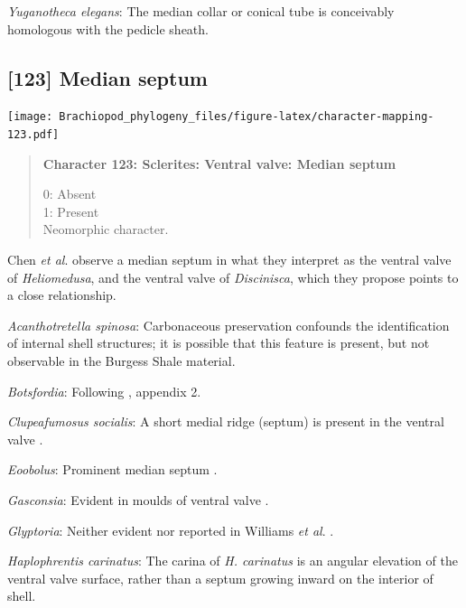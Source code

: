\documentclass[openany]{book}
\begin{document}
\hypertarget{Yuganotheca_elegans-coding-122}{}
\emph{Yuganotheca elegans}: The median collar or conical tube is
conceivably homologous with the pedicle sheath.

\subsection*{{[}123{]} Median septum}\label{median-septum}

\texttt{[image: Brachiopod\_phylogeny\_files/figure-latex/character-mapping-123.pdf]}

\begin{quote}
\textbf{Character 123: Sclerites: Ventral valve: Median septum}

0: Absent\\
1: Present\\
Neomorphic character.
\end{quote}

Chen \emph{et al}. \citeyearpar{Chen2007Reinterpretationof} observe a
median septum in what they interpret as the ventral valve of
\emph{Heliomedusa}, and the ventral valve of \emph{Discinisca}, which
they propose points to a close relationship.

\hypertarget{Acanthotretella_spinosa-coding-123}{}
\emph{Acanthotretella spinosa}: Carbonaceous preservation confounds the
identification of internal shell structures; it is possible that this
feature is present, but not observable in the Burgess Shale material.

\hypertarget{Botsfordia-coding-123}{}
\emph{Botsfordia}: Following \citet{Williams1998Thediversity}, appendix
2.

\hypertarget{Clupeafumosus_socialis-coding-123}{}
\emph{Clupeafumosus socialis}: A short medial ridge (septum) is present
in the ventral valve \citep{Topper2013Reappraisalof}.

\hypertarget{Eoobolus-coding-123}{}
\emph{Eoobolus}: Prominent median septum \citep[fig. 4d, e
in][]{Balthasar2009Thebrachiopod}.

\hypertarget{Gasconsia-coding-123}{}
\emph{Gasconsia}: Evident in moulds of ventral valve
\citep{Hanken1985Thetaxonomy, Watkins2002Newrecord}.

\hypertarget{Glyptoria-coding-123}{}
\emph{Glyptoria}: Neither evident nor reported in Williams \emph{et al}.
\citeyearpar{Williams2000LinguliformeaCraniiformea}.

\hypertarget{Haplophrentis_carinatus-coding-123}{}
\emph{Haplophrentis carinatus}: The carina of \emph{H. carinatus} is an
angular elevation of the ventral valve surface, rather than a septum
growing inward on the interior of shell.
\end{document}
